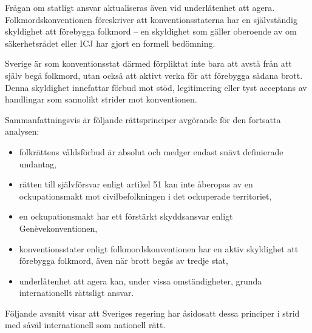 

\medskip

Frågan om statligt ansvar aktualiseras även vid underlåtenhet att agera. Folkmordskonventionen föreskriver att konventionsstaterna har en självständig skyldighet att förebygga folkmord – en skyldighet som gäller oberoende av om säkerhetsrådet eller ICJ har gjort en formell bedömning.

Sverige är som konventionsstat därmed förpliktat inte bara att avstå från att själv begå folkmord, utan också att aktivt verka för att förebygga sådana brott. Denna skyldighet innefattar förbud mot stöd, legitimering eller tyst acceptans av handlingar som sannolikt strider mot konventionen.

\medskip

Sammanfattningsvis är följande rättsprinciper avgörande för den fortsatta analysen:

\begin{itemize}
  \item folkrättens våldsförbud är absolut och medger endast snävt definierade undantag,
  \item rätten till självförsvar enligt artikel 51 kan inte åberopas av en ockupationsmakt mot civilbefolkningen i det ockuperade territoriet,
  \item en ockupationsmakt har ett förstärkt skyddsansvar enligt Genèvekonventionen,
  \item konventionsstater enligt folkmordskonventionen har en aktiv skyldighet att förebygga folkmord, även när brott begås av tredje stat,
  \item underlåtenhet att agera kan, under vissa omständigheter, grunda internationellt rättsligt ansvar.
\end{itemize}

Följande avsnitt visar att Sveriges regering har åsidosatt dessa principer i strid med såväl internationell som nationell rätt.
